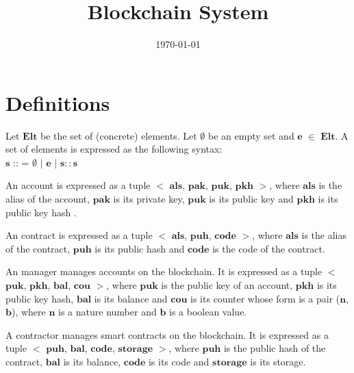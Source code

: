 \documentclass[a4paper]{llncs}
\title{Blockchain System}
\author{}
\institute{}
\date{\today}
\begin{document}
\maketitle


\section{Definitions}
\begin{definition}[Set]
Let $\mathbf{Elt}$ be the set of (concrete) elements. Let $\emptyset$ be an empty set and $\mathbf{e}$ $\in$  $\mathbf{Elt}$. A set of elements is expressed as the following syntax:
\\
$\mathbf{s}$ :: = $\emptyset$ $\mid$ $\mathbf{e}$ $\mid$ $\mathbf{s :: s}$
\end{definition}

\begin{definition}[Account]
An account is expressed as a tuple $<$ $\mathbf{als}$, $\mathbf{pak}$, $\mathbf{puk}$, $\mathbf{pkh}$ $>$, where $\mathbf{als}$ is the alias of the account, $\mathbf{pak}$ is its private key, $\mathbf{puk}$ is its public key and $\mathbf{pkh}$ is its public key hash . 
\end{definition}

\begin{definition}[Contract]
An contract is expressed as a tuple $<$ $\mathbf{als}$, $\mathbf{puh}$, $\mathbf{code}$ $>$, where $\mathbf{als}$ is the alias of the contract, $\mathbf{puh}$ is its public hash and $\mathbf{code}$ is the code of the contract.
\end{definition}

\begin{definition}[Manager]
An manager manages accounts on the blockchain. It is expressed as a tuple $<$ $\mathbf{puk}$, $\mathbf{pkh}$, $\mathbf{bal}$,  $\mathbf{cou}$ $>$, where  $\mathbf{puk}$ is the public key of an account, $\mathbf{pkh}$ is its public key hash, $\mathbf{bal}$ is its balance and $\mathbf{cou}$ is its counter whose form is a pair ($\mathbf{n}$, $\mathbf{b}$), where $\mathbf{n}$ is a nature number and $\mathbf{b}$ is a boolean value. 
\end{definition}

\begin{definition}[Contractor]
A contractor manages smart contracts on the blockchain. It is expressed as a tuple $<$ $\mathbf{puh}$, $\mathbf{bal}$,  $\mathbf{code}$,  $\mathbf{storage}$ $>$, where $\mathbf{puh}$ is the public hash of the contract, $\mathbf{bal}$ is its balance, $\mathbf{code}$ is its code and  $\mathbf{storage}$ is its storage. 
\end{definition}
\end{document}
